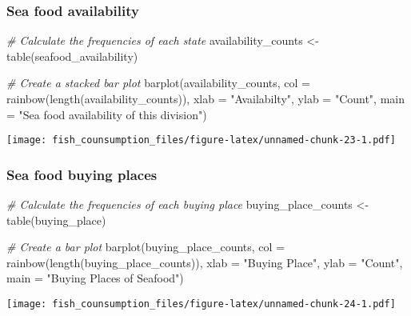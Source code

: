 \documentclass[
]{article}
\newenvironment{Shaded}{\begin{snugshade}}{\end{snugshade}}
\newcommand{\AttributeTok}[1]{\textcolor[rgb]{0.77,0.63,0.00}{#1}}
\newcommand{\CommentTok}[1]{\textcolor[rgb]{0.56,0.35,0.01}{\textit{#1}}}
\newcommand{\FunctionTok}[1]{\textcolor[rgb]{0.00,0.00,0.00}{#1}}
\newcommand{\NormalTok}[1]{#1}
\newcommand{\OtherTok}[1]{\textcolor[rgb]{0.56,0.35,0.01}{#1}}
\newcommand{\StringTok}[1]{\textcolor[rgb]{0.31,0.60,0.02}{#1}}
\begin{document}
\hypertarget{sea-food-availability}{%
\subsubsection{Sea food availability}\label{sea-food-availability}}

\begin{Shaded}
\begin{Highlighting}[]
\CommentTok{\# Calculate the frequencies of each state}
\NormalTok{availability\_counts }\OtherTok{\textless{}{-}} \FunctionTok{table}\NormalTok{(seafood\_availability)}

\CommentTok{\# Create a stacked bar plot}
\FunctionTok{barplot}\NormalTok{(availability\_counts, }\AttributeTok{col =} \FunctionTok{rainbow}\NormalTok{(}\FunctionTok{length}\NormalTok{(availability\_counts)), }
        \AttributeTok{xlab =} \StringTok{"Availabilty"}\NormalTok{, }\AttributeTok{ylab =} \StringTok{"Count"}\NormalTok{, }\AttributeTok{main =} \StringTok{"Sea food availability of this division"}\NormalTok{)}
\end{Highlighting}
\end{Shaded}

\texttt{[image: fish\_counsumption\_files/figure-latex/unnamed-chunk-23-1.pdf]}

\hypertarget{sea-food-buying-places}{%
\subsubsection{Sea food buying places}\label{sea-food-buying-places}}

\begin{Shaded}
\begin{Highlighting}[]
\CommentTok{\# Calculate the frequencies of each buying place}
\NormalTok{buying\_place\_counts }\OtherTok{\textless{}{-}} \FunctionTok{table}\NormalTok{(buying\_place)}

\CommentTok{\# Create a bar plot}
\FunctionTok{barplot}\NormalTok{(buying\_place\_counts, }\AttributeTok{col =} \FunctionTok{rainbow}\NormalTok{(}\FunctionTok{length}\NormalTok{(buying\_place\_counts)), }
        \AttributeTok{xlab =} \StringTok{"Buying Place"}\NormalTok{, }\AttributeTok{ylab =} \StringTok{"Count"}\NormalTok{, }\AttributeTok{main =} \StringTok{"Buying Places of Seafood"}\NormalTok{)}
\end{Highlighting}
\end{Shaded}

\texttt{[image: fish\_counsumption\_files/figure-latex/unnamed-chunk-24-1.pdf]}
\end{document}
